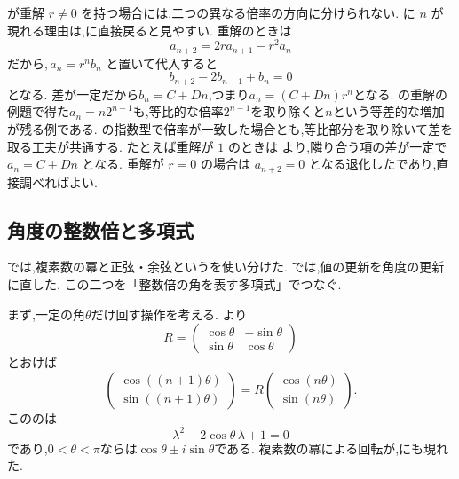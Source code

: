 が重解 $r\ne0$ を持つ場合には,二つの異なる倍率の方向に分けられない.
に $n$ が現れる理由は,に直接戻ると見やすい.
重解のときは
\[
  a_{n+2}=2r a_{n+1}-r^2a_n
\]
だから,$\,a_n=r^n b_n$ と置いて代入すると
\[
  b_{n+2}-2b_{n+1}+b_n=0
\]
となる.
差が一定だから$b_n=C+Dn$,つまり$a_n=(C+Dn)r^n$となる.
の重解の例題で得た$a_n=n2^{n-1}$も,等比的な倍率$2^{n-1}$を取り除くと$n$という等差的な増加が残る例である.
の指数型で倍率が一致した場合とも,等比部分を取り除いて差を取る工夫が共通する.
たとえば重解が $1$ のときは
\BookMathLayout{\[
    a_{n+2}-2a_{n+1}+a_n
    =(a_{n+2}-a_{n+1})-(a_{n+1}-a_n)=0
  \]}{
  \[
    \begin{aligned}
      a_{n+2}-2a_{n+1}+a_n\\
      {}=(a_{n+2}-a_{n+1})-(a_{n+1}-a_n)\\
      {}=0
    \end{aligned}
  \]
}
より,隣り合う項の差が一定で $a_n=C+Dn$ となる.
重解が $r=0$ の場合は $a_{n+2}=0$ となる退化したであり,直接調べればよい.

\subsection{角度の整数倍と多項式}\label{節：角度の整数倍と多項式}

では,複素数の冪と正弦・余弦というを使い分けた.
では,値の更新を角度の更新に直した.
この二つを「整数倍の角を表す多項式」でつなぐ.

まず,一定の角$\theta$だけ回す操作を考える.
より
\[
  R=\begin{pmatrix}\cos\theta&-\sin\theta\\
    \sin\theta&\cos\theta\end{pmatrix}
\]
とおけば
\[
  \begin{pmatrix}\cos((n+1)\theta)\\\sin((n+1)\theta)\end{pmatrix}
  =R\begin{pmatrix}\cos(n\theta)\\\sin(n\theta)\end{pmatrix}.
\]
こののは
\[
  \lambda^2-2\cos\theta\,\lambda+1=0
\]
であり,$0<\theta<\pi$ならは$\cos\theta\pm i\sin\theta$である.
複素数の冪による回転が,にも現れた.

